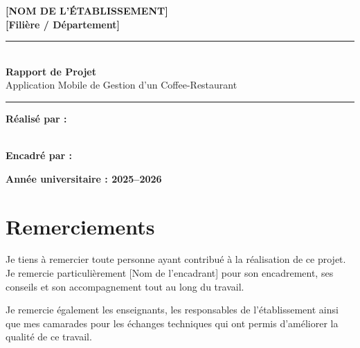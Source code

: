 \documentclass[12pt,a4paper]{report}
\begin{document}
\begin{titlepage}
\centering

\vspace*{0.5cm}
\textbf{\Large [NOM DE L'ÉTABLISSEMENT]}\\[0.2cm]
\textbf{[Filière / Département]}\\[1.2cm]

\rule{\textwidth}{0.8pt}\\[0.7cm]
{\fontsize{28}{34}\selectfont
\textbf{Rapport de Projet}\\[0.3cm]
}
{\Large Application Mobile de Gestion d'un Coffee-Restaurant}\\[0.7cm]
\rule{\textwidth}{0.8pt}

\vspace{1.5cm}


\vfill

\begin{minipage}[t]{0.48\textwidth}
\textbf{Réalisé par :}\\
[Nom et prénom]\\
[Classe / Groupe]
\end{minipage}
\hfill
\begin{minipage}[t]{0.48\textwidth}
\textbf{Encadré par :}\\
[Nom de l'encadrant]
\end{minipage}

\vfill
\textbf{Année universitaire : 2025--2026}
\end{titlepage}

\chapter*{Remerciements}

Je tiens à remercier toute personne ayant contribué à la réalisation de ce projet.
Je remercie particulièrement [Nom de l'encadrant] pour son encadrement, ses conseils
et son accompagnement tout au long du travail.

Je remercie également les enseignants, les responsables de l'établissement ainsi que
mes camarades pour les échanges techniques qui ont permis d'améliorer la qualité de
ce travail.
\end{document}
